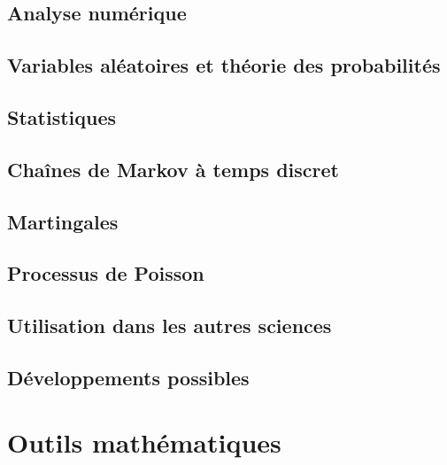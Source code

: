 \chapter{Analyse numérique}


\chapter{Variables aléatoires et théorie des probabilités}




\chapter{Statistiques}


\chapter{Chaînes de Markov à temps discret}


\chapter{Martingales}


\chapter{Processus de Poisson}


\chapter{Utilisation dans les autres sciences}


\chapter{Développements possibles}


\part{Outils mathématiques}         %

